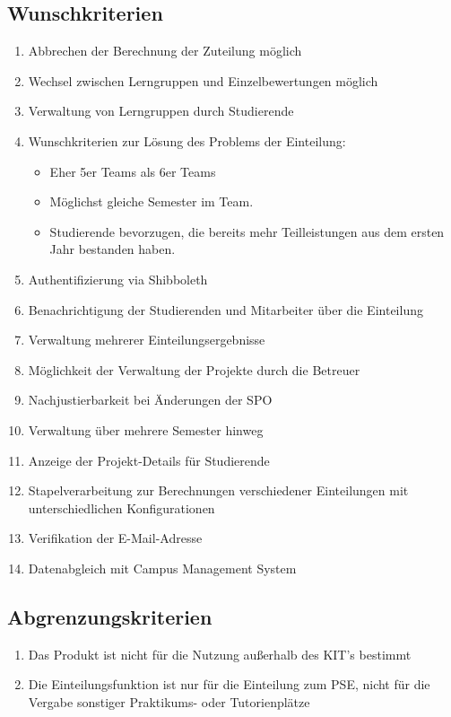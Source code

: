 \documentclass[parskip=full]{scrartcl}
\newcommand{\swtLabel}[1]{\textbf{\textbackslash #1\arabic*0\textbackslash}}
\begin{document}
\subsection{Wunschkriterien}
\begin{enumerate}[label=\swtLabel{W}]
  \item Abbrechen der Berechnung der Zuteilung möglich 
    \item Wechsel zwischen Lerngruppen und 
    Einzelbewertungen möglich %
    \item Verwaltung von Lerngruppen durch Studierende
    \item Wunschkriterien zur Lösung des Problems der Einteilung:
    \begin{itemize}
        \item Eher 5er Teams als 6er Teams
        \item Möglichst gleiche Semester im Team.
        \item Studierende bevorzugen, die bereits mehr Teilleistungen aus dem
        ersten Jahr bestanden haben.
    \end{itemize}    
    \item Authentifizierung via Shibboleth
    \item Benachrichtigung der Studierenden und Mitarbeiter über die Einteilung
    \item Verwaltung mehrerer Einteilungsergebnisse
    \item Möglichkeit der Verwaltung der Projekte durch die Betreuer  %
    \item Nachjustierbarkeit bei Änderungen der SPO %
    \item Verwaltung über mehrere Semester hinweg
    \item Anzeige der Projekt-Details für Studierende
    \item Stapelverarbeitung zur Berechnungen verschiedener Einteilungen mit
    unterschiedlichen Konfigurationen
    \item Verifikation der E-Mail-Adresse
    \item Datenabgleich mit Campus Management System %
    
    
    
\end{enumerate}

\subsection{Abgrenzungskriterien}
\begin{enumerate}[label=\swtLabel{A}]
 
  \item Das Produkt ist nicht für die Nutzung außerhalb des KIT's bestimmt

\item Die Einteilungsfunktion ist nur für die Einteilung zum PSE, nicht
für die Vergabe sonstiger Praktikums- oder Tutorienplätze
  
\end{enumerate}
\end{document}
